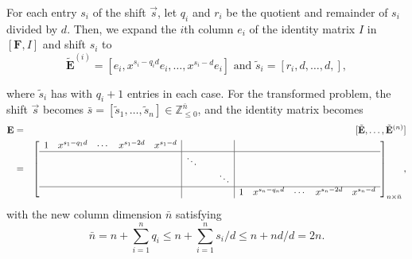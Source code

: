 For each entry $s_{i}$ of the shift $\vec{s}$, let $q_{i}$ and
$r_{i}$ be the quotient and remainder of $s_{i}$ divided by $d$.
Then, we expand the $i$th column $e_{i}$ of the identity matrix
$I$ in $[\mathbf{F},I]$ and shift $s_{i}$ to
\[
\tilde{\mathbf{E}}^{(i)}=\left[e_{i},x^{s_{i}-q_{i}d}e_{i},\dots,x^{s_{i}-d}e_{i}\right]\mbox{ and }\tilde{s}_{i}=\left[r_{i},d,\dots,d,\right],
\]
\begin{comment}
\[
\tilde{\mathbf{E}}^{(i)}=\left[e_{i},x^{d}e_{i},\dots,x^{q_{i}d}e_{i},x^{q_{i}d+r_{i}}e_{i}\right]\mbox{ and }\tilde{s}_{i}=\left[d,\dots,d,r_{i}\right],
\]
\end{comment}
{} where $\tilde{s}_{i}$ has with $q_{i}+1$ entries in each case.
For the transformed problem, the shift $\vec{s}$ becomes $\bar{s}=[\tilde{s}_{1},\dots,\tilde{s}_{n}]\in\mathbb{Z}_{\le0}^{\bar{n}}$,
and the identity matrix becomes
\begin{eqnarray*}
\mathbf{E} & = & [\tilde{\mathbf{E}},\dots,\tilde{\mathbf{E}}^{\left(n\right)}]\\
 & = & \left[\begin{array}{ccccc|ccc|ccccccc}
1 & x^{s_{1}-q_{1}d} & \cdots & x^{s_{1}-2d} & x^{s_{1}-d} &  &  & \\
\hline  &  &  &  &  & \ddots &  & \\
 &  &  &  &  &  & \  & \ddots\\
\hline  &  &  &  &  &  &  &  & 1 & x^{s_{n}-q_{n}d} & \cdots & x^{s_{n}-2d} & x^{s_{n}-d}
\end{array}\right]_{n\times\bar{n}},
\end{eqnarray*}
 with the new column dimension $\bar{n}$ satisfying 
\[
\bar{n}=n+\sum_{i=1}^{n}q_{i}\le n+\sum_{i=1}^{n}s_{i}/d\le n+nd/d=2n.
\]


